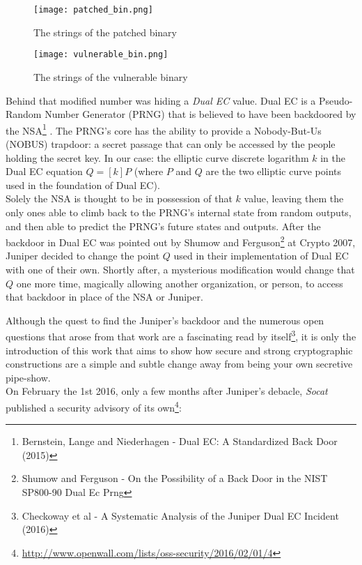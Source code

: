 \documentclass[a4paper,11pt,twocolumn]{article}
\begin{document}
\begin{figure}[t]
\centering
\texttt{[image: patched\_bin.png]}
\caption{The strings of the patched binary}\label{screenOS}
\end{figure}

\begin{figure}[t]
\centering
\texttt{[image: vulnerable\_bin.png]}
\caption{The strings of the vulnerable binary}\label{screenOS}
\end{figure}

Behind that modified number was hiding a \emph{Dual EC} value. Dual EC is a Pseudo-Random Number Generator (PRNG) that is believed to have been backdoored by the NSA\footnote{Bernstein, Lange and Niederhagen - Dual EC: A Standardized Back Door (2015)} \cite{dualEC}. The PRNG's core has the ability to provide a Nobody-But-Us (NOBUS) trapdoor: a secret passage that can only be accessed by the people holding the secret key. In our case: the elliptic curve discrete logarithm $k$ in the Dual EC equation $Q = [k]P$ (where $P$ and $Q$ are the two elliptic curve points used in the foundation of Dual EC).\\
Solely the NSA is thought to be in possession of that $k$ value, leaving them the only ones able to climb back to the PRNG's internal state from random outputs, and then able to predict the PRNG's future states and outputs. After the backdoor in Dual EC was pointed out by Shumow and Ferguson\footnote{Shumow and Ferguson - On the Possibility of a Back Door in the NIST SP800-90 Dual Ec Prng}\cite{shumow-ferguson} at Crypto 2007, Juniper decided to change the point $Q$ used in their implementation of Dual EC with one of their own. Shortly after, a mysterious modification would change that $Q$ one more time, magically allowing another organization, or person, to access that backdoor in place of the NSA or Juniper.

Although the quest to find the Juniper's backdoor and the numerous open questions that arose from that work are a fascinating read by itself\footnote{Checkoway et al - A Systematic Analysis of the Juniper Dual EC Incident (2016)}\cite{juniper}, it is only the introduction of this work that aims to show how secure and strong cryptographic constructions are a simple and subtle change away from being your own secretive pipe-show.\\

On February the 1st 2016, only a few months after Juniper's debacle, \emph{Socat} published a security advisory of its own\footnote{\url{http://www.openwall.com/lists/oss-security/2016/02/01/4}}:
\end{document}
